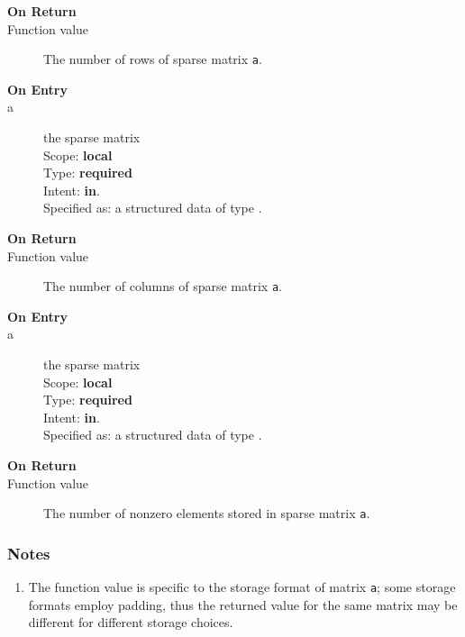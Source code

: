\begin{description}
\item[\bf On Return]
\item[Function value] The number of  rows  of sparse matrix \verb|a|.
\end{description}




\begin{description}
\item[\bf On Entry]
\item[a] the sparse matrix\\
Scope: {\bf local}\\
Type: {\bf required}\\
Intent: {\bf in}.\\
Specified as: a structured data of type \spdata.
\end{description}

\begin{description}
\item[\bf On Return]
\item[Function value] The number of  columns  of sparse matrix \verb|a|.
\end{description}




\begin{description}
\item[\bf On Entry]
\item[a] the sparse matrix\\
Scope: {\bf local}\\
Type: {\bf required}\\
Intent: {\bf in}.\\
Specified as: a structured data of type \spdata.
\end{description}

\begin{description}
\item[\bf On Return]
\item[Function value] The number of nonzero elements stored in sparse matrix \verb|a|.
\end{description}

\subsubsection*{Notes}
\begin{enumerate}
\item The function value is specific to the storage format of matrix
  \verb|a|; some storage formats employ padding, thus the returned
  value for the same matrix may be different for different storage choices.
\end{enumerate}


